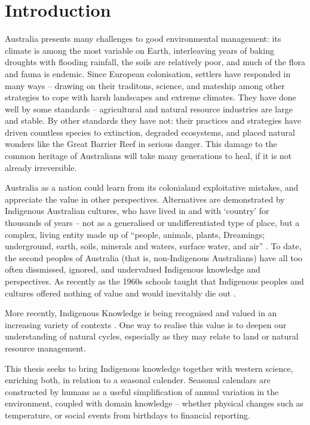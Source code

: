 \chapter{Introduction}
\label{ch:introduction}

Australia presents many challenges to good environmental management: its
climate is among the most variable on Earth, interleaving years of baking
droughts with flooding rainfall, the soils are relatively poor, and much of
the flora and fauna is endemic.
%
Since European colonisation, settlers have responded in many ways --
drawing on their traditons, science, and mateship among other strategies to cope
with harsh landscapes and extreme climates.
%
They have done well by some standards -- agricultural and natural
resource industries are large and stable.  By other standards they have not:
their practices and strategies have driven countless species to extinction,
degraded ecosystems, and placed natural wonders like the Great Barrier Reef
in serious danger.  This damage to the common heritage of Australians will
take many generations to heal, if it is not already irreversible.

Australia as a nation could learn from its colonialand exploitative mistakes,
and appreciate the value in other perspectives.  Alternatives are demonstrated
by Indigenous Australian cultures, who have lived in and with `country' for
thousands of years -- not as a generalised or undifferentiated
type of place, but a complex, living entity made up of ``people, animals,
plants, Dreamings; underground, earth, soils, minerals and waters, surface
water, and air'' \citep{birdrose1996}.
%
To date, the second peoples of Australia (that is, non-Indigenous Australians)
have all too often dissmissed, ignored, and undervalued Indigenous knowledge
and perspectives.  As recently as the 1960s schools taught that Indigenous
peoples and cultures offered nothing of value and would inevitably die out
\citep{flannery1994}.


More recently, Indigenous Knowledge is being recognised and valued in an
increasing variety of contexts \citep[eg.][]{petheram2010,cochran2015,
berkes2012}.  One way to realise this value is to deepen our understanding
of natural cycles, especially as they may relate to land or natural resource
management.

This thesis seeks to bring Indigenous knowledge together with
western science, enriching both, in relation to a seasonal calender.
Seasonal calendars are constructed by humans as a useful simplification of
annual variation in the environment, coupled with domain knowledge -- whether
physical changes such as temperature, or social events from birthdays to
financial reporting.

